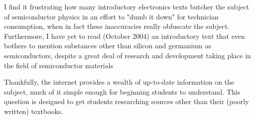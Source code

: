 
I find it frustrating how many introductory electronics texts butcher the subject of semiconductor physics in an effort to "dumb it down" for technician consumption, when in fact these inaccuracies really obfuscate the subject.  Furthermore, I have yet to read (October 2004) an introductory text that even bothers to mention substances other than silicon and germanium as semiconductors, despite a great deal of research and development taking place in the field of semiconductor materials

Thankfully, the internet provides a wealth of up-to-date information on the subject, much of it simple enough for beginning students to understand.  This question is designed to get students researching sources other than their (poorly written) textbooks.




